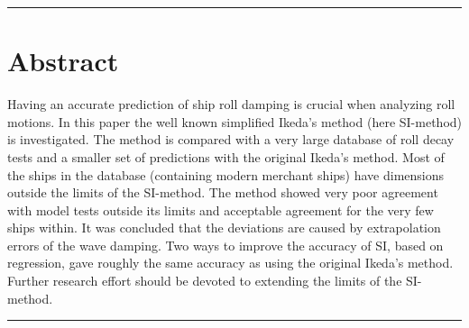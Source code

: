 {\footnotesize
\noindent\rule{\columnwidth}{0.4pt}
\section*{Abstract}\label{se:abstract}
Having an accurate prediction of ship roll damping is crucial when analyzing roll motions. In this paper the well known simplified Ikeda's method (here SI-method) is investigated. The method is compared with a very large database of roll decay tests and a smaller set of predictions with the original Ikeda's method. Most of the ships in the database (containing modern merchant ships) have dimensions outside the limits of the SI-method. The method showed very poor agreement with model tests outside its limits and acceptable agreement for the very few ships within. It was concluded that the deviations are caused by extrapolation errors of the wave damping. Two ways to improve the accuracy of SI, based on regression, gave roughly the same accuracy as using the original Ikeda's method. Further research effort should be devoted to extending the limits of the SI-method. 

}
\newline
\noindent\rule{\columnwidth}{0.4pt}
